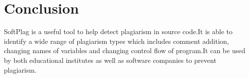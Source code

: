 \chapter{Conclusion}

SoftPlag is a useful tool to help detect plagiarism in source code.It is able to identify a wide range of plagiarism types which includes comment addition, changing names of variables and changing control flow of program.It can be used by both educational institutes as well as software companies to prevent plagiarism.

